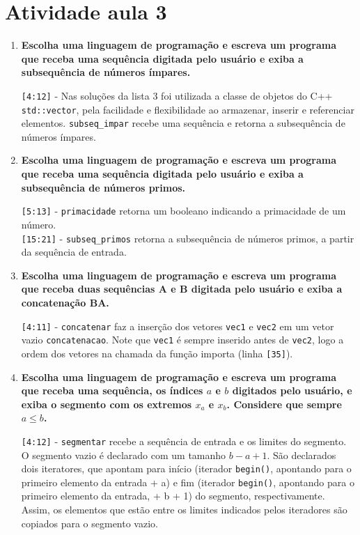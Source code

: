 \section*{Atividade aula 3}

\begin{enumerate}
	\item \textbf{Escolha uma linguagem de programação e escreva um programa que receba	uma sequência digitada pelo usuário e exiba a subsequência de números ímpares.}
	
	\verb|[4:12]| - Nas soluções da lista 3 foi utilizada a classe de objetos do C++ \verb|std::vector|, pela facilidade e flexibilidade ao armazenar, inserir e referenciar elementos. \verb|subseq_impar| recebe uma sequência e retorna a subsequência de números ímpares.
	
	\pagebreak
	\item \textbf{Escolha uma linguagem de programação e escreva um programa que receba	uma sequência digitada pelo usuário e exiba a subsequência de números primos.}
	
	\verb|[5:13]| - \verb|primacidade| retorna um booleano indicando a primacidade de um número.\\
	\verb|[15:21]| - \verb|subseq_primos| retorna a subsequência de números primos, a partir da sequência de entrada.
	
	\pagebreak
	\item \textbf{Escolha uma linguagem de programação e escreva um programa que receba	duas sequências A e B digitada pelo usuário e exiba a concatenação BA.}
	
	\verb|[4:11]| - \verb|concatenar| faz a inserção dos vetores \verb|vec1| e \verb|vec2| em um vetor vazio \verb|concatenacao|. Note que \verb|vec1| é sempre inserido antes de \verb|vec2|, logo a ordem dos vetores na chamada da função importa (linha \verb|[35]|).
	
	\pagebreak
	\item \textbf{Escolha uma linguagem de programação e escreva um programa que receba	uma sequência, os índices $a$ e $b$ digitados pelo usuário, e exiba o segmento com os extremos $x_a$ e $x_b$. Considere que sempre $a \leq b$.}
	
	\verb|[4:12]| - \verb|segmentar| recebe a sequência de entrada e os limites do segmento. O segmento vazio é declarado com um tamanho $b-a+1$. São declarados dois iteratores, que apontam para início (iterador \verb|begin()|, apontando para o primeiro elemento da entrada + a) e fim (iterador \verb|begin()|, apontando para o primeiro elemento da entrada, + b + 1) do segmento, respectivamente. Assim, os elementos que estão entre os limites indicados pelos iteradores são copiados para o segmento vazio.
	

\end{enumerate}
